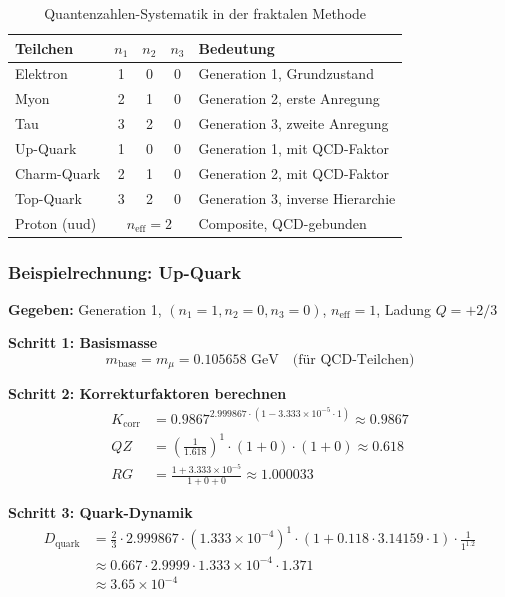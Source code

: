 	\begin{table}[h]
		\centering
		\small
		\begin{tabular}{lcccl}
			\toprule
			\textbf{Teilchen} & \textbf{$n_1$} & \textbf{$n_2$} & \textbf{$n_3$} & \textbf{Bedeutung} \\
			\midrule
			Elektron & 1 & 0 & 0 & Generation 1, Grundzustand \\
			Myon & 2 & 1 & 0 & Generation 2, erste Anregung \\
			Tau & 3 & 2 & 0 & Generation 3, zweite Anregung \\
			Up-Quark & 1 & 0 & 0 & Generation 1, mit QCD-Faktor \\
			Charm-Quark & 2 & 1 & 0 & Generation 2, mit QCD-Faktor \\
			Top-Quark & 3 & 2 & 0 & Generation 3, inverse Hierarchie \\
			Proton (uud) & \multicolumn{3}{c}{$n_{\text{eff}} = 2$} & Composite, QCD-gebunden \\
			\bottomrule
		\end{tabular}
		\caption{Quantenzahlen-Systematik in der fraktalen Methode}
		\label{tab:qn_fractal}
	\end{table}
	
	\subsubsection{Beispielrechnung: Up-Quark}
	
	\textbf{Gegeben:} Generation 1, $(n_1=1, n_2=0, n_3=0)$, $n_{\text{eff}}=1$, Ladung $Q=+2/3$
	
	\textbf{Schritt 1: Basismasse}
	\begin{equation}
		m_{\text{base}} = m_\mu = 0.105658 \text{ GeV} \quad \text{(für QCD-Teilchen)}
	\end{equation}
	
	\textbf{Schritt 2: Korrekturfaktoren berechnen}
	\begin{align}
		K_{\text{corr}} &= 0.9867^{2.999867 \cdot (1 - 3.333 \times 10^{-5} \cdot 1)} \approx 0.9867 \\
		QZ &= \left(\frac{1}{1.618}\right)^1 \cdot (1 + 0) \cdot (1 + 0) \approx 0.618 \\
		RG &= \frac{1 + 3.333 \times 10^{-5}}{1 + 0 + 0} \approx 1.000033
	\end{align}
	
	\textbf{Schritt 3: Quark-Dynamik}
	\begin{align}
		D_{\text{quark}} &= \frac{2}{3} \cdot 2.999867 \cdot (1.333 \times 10^{-4})^1 \cdot (1 + 0.118 \cdot 3.14159 \cdot 1) \cdot \frac{1}{1^{1.2}} \\
		&\approx 0.667 \cdot 2.9999 \cdot 1.333 \times 10^{-4} \cdot 1.371 \\
		&\approx 3.65 \times 10^{-4}
	\end{align}
	
